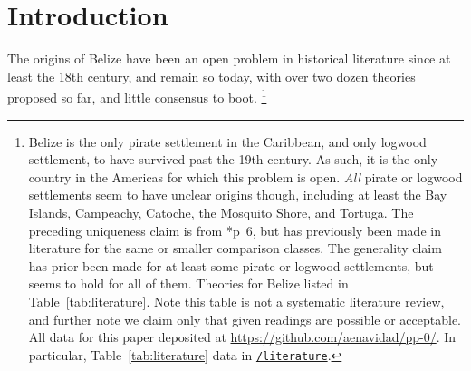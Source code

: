 
%
%
%
%
\section{Introduction}
\label{s:intro}
	The origins of Belize have been an open problem in historical literature since at least the 18th century, and remain so today, with over two dozen theories proposed so far, and little consensus to boot.%
	\footnote{Belize is the only pirate settlement in the Caribbean, and only logwood settlement, to have survived past the 19th century. As such, it is the only country in the Americas for which this problem is open. \emph{All} pirate or logwood settlements seem to have unclear origins though, including at least the Bay Islands, Campeachy, Catoche, the Mosquito Shore, and Tortuga. The preceding uniqueness claim is from \cite{res19}*{p~6}, but has previously been made in literature for the same or smaller comparison classes. The generality claim has prior been made for at least some pirate or logwood settlements, but seems to hold for all of them. Theories for Belize listed in Table~\ref{tab:literature}. Note this table is not a systematic literature review, and further note we claim only that given readings are possible or acceptable. All data for this paper deposited at \url{https://github.com/aenavidad/pp-0/}. In particular, Table~\ref{tab:literature} data in \href{https://github.com/aenavidad/pp-0/tree/main/literature}{\nolinkurl{/literature}}.} %
	

